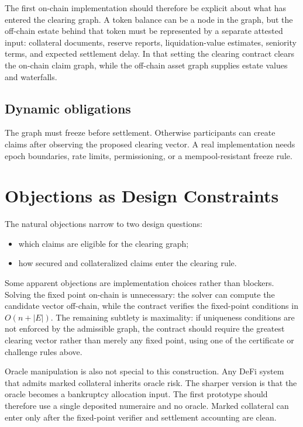 \documentclass[11pt,oneside]{article}
\begin{document}
The first on-chain implementation should therefore be explicit about what has
entered the clearing graph. A token balance can be a node in the graph, but the
off-chain estate behind that token must be represented by a separate attested
input: collateral documents, reserve reports, liquidation-value estimates,
seniority terms, and expected settlement delay. In that setting the clearing
contract clears the on-chain claim graph, while the off-chain asset graph
supplies estate values and waterfalls.

\subsection{Dynamic obligations}

The graph must freeze before settlement. Otherwise participants can create
claims after observing the proposed clearing vector. A real implementation needs
epoch boundaries, rate limits, permissioning, or a mempool-resistant freeze
rule.

\section{Objections as Design Constraints}

The natural objections narrow to two design questions:

\begin{itemize}[leftmargin=1.5em]
  \item which claims are eligible for the clearing graph;
  \item how secured and collateralized claims enter the clearing rule.
\end{itemize}

Some apparent objections are implementation choices rather than blockers.
Solving the fixed point on-chain is unnecessary: the solver can compute the
candidate vector off-chain, while the contract verifies the fixed-point
conditions in $O(n+|E|)$. The remaining subtlety is maximality: if uniqueness
conditions are not enforced by the admissible graph, the contract should require
the greatest clearing vector rather than merely any fixed point, using one of
the certificate or challenge rules above.

Oracle manipulation is also not special to this construction. Any DeFi system
that admits marked collateral inherits oracle risk. The sharper version is that
the oracle becomes a bankruptcy allocation input. The first prototype should
therefore use a single deposited numeraire and no oracle. Marked collateral can
enter only after the fixed-point verifier and settlement accounting are clean.
\end{document}
